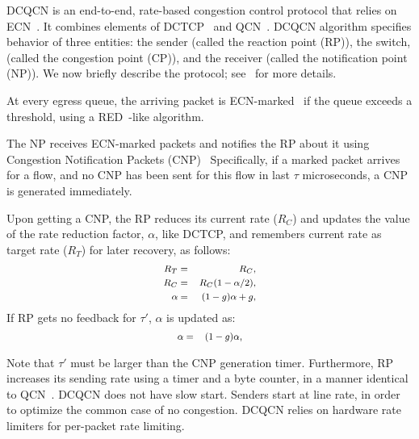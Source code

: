 DCQCN is an end-to-end, rate-based congestion control protocol that relies on
ECN~\cite{ecn}. It combines elements of DCTCP~\cite{dctcp} and QCN~\cite{qcn}.
DCQCN algorithm specifies behavior of three entities: the sender (called the
reaction point (RP)), the switch, (called the congestion point (CP)), and the
receiver (called the notification point (NP)). We now briefly describe the
protocol; see~\cite{dcqcn} for more details.

 At every egress queue, the arriving packet is
ECN-marked~\cite{ecn} if the queue exceeds a threshold, using a
RED~\cite{red}-like algorithm.

 The NP receives ECN-marked packets and notifies the RP about
it using Congestion Notification Packets (CNP)~\cite{rocev2} Specifically, if a
marked packet arrives for a flow, and no CNP has been sent for this flow in last
$\tau$ microseconds, a CNP is generated immediately.

 Upon getting a CNP, the RP reduces its current rate ($R_C$)
and updates the value of the rate reduction factor, $\alpha$, like DCTCP, and
remembers current rate as target rate ($R_T$) for later recovery, as follows:
\begin{equation} 
\small 
\begin{aligned} 
R_T &=& R_C,	\\ 
R_C &=& R_C (1 -\alpha/2),  \\ 
\alpha &=& (1-g)\alpha + g, 
\end{aligned} 
\label{eq:rp_dec}
\end{equation} 
If RP gets no feedback for $\tau'$, $\alpha$ is updated as:
\begin{equation} 
\small 
\begin{aligned} 
\alpha &=& (1-g)\alpha, 
\end{aligned}
\label{eq:rp_alpha_recover} 
\end{equation}

Note that $\tau'$ must be larger than the CNP generation timer. Furthermore, RP
increases its sending rate using a timer and a byte counter, in a manner
identical to QCN~\cite{qcn}. 
DCQCN does not have slow start. Senders start at
line rate, in order to optimize the common case of no congestion. DCQCN relies
on hardware rate limiters for per-packet rate limiting. 
